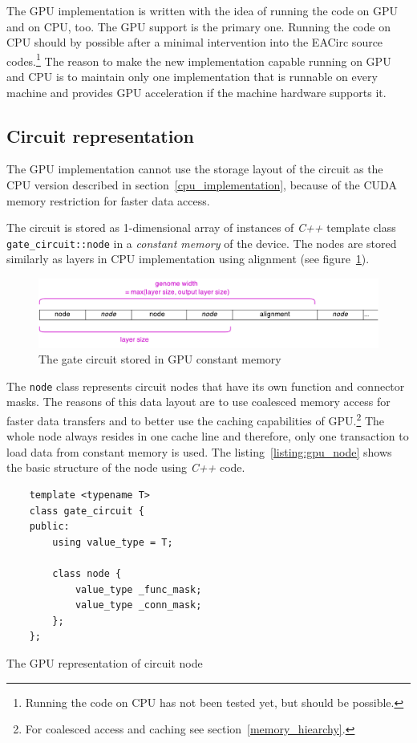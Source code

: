 \documentclass[12pt,oneside]{fithesis2}
\begin{document}
The GPU implementation is written with the idea of running the code on GPU and on CPU, too. The GPU support is the primary one. Running the code on CPU should by possible after a minimal intervention into the EACirc source codes.\footnote{Running the code on CPU has not been tested yet, but should be possible.} The reason to make the new implementation capable running on GPU and CPU is to maintain only one implementation that is runnable on every machine and provides GPU acceleration if the machine hardware supports it.

\subsection{Circuit representation}
\label{gpu_curcuit_repr}

The GPU implementation cannot use the storage layout of the circuit as the CPU version described in section~\ref{cpu_implementation}, because of the CUDA memory restriction for faster data access.

The circuit is stored as 1-dimensional array of instances of \emph{C++} template class \texttt{gate\_circuit::node} in a \emph{constant memory} of the device. The nodes are stored similarly as layers in CPU implementation using alignment (see figure~\ref{fig:gpu_genome}).

\begin{figure}[h]
	\centering
	\includegraphics[width=\textwidth]{figures/gpu_genome.pdf}
	\caption{The gate circuit stored in GPU constant memory}
	\label{fig:gpu_genome}
\end{figure}


The \texttt{node} class represents circuit nodes that have its own function and connector masks. The reasons of this data layout are to use coalesced memory access for faster data transfers and to better use the caching capabilities of GPU.\footnote{For coalesced access and caching see section~\ref{memory_hiearchy}.} The whole node always resides in one cache line and therefore, only one transaction to load data from constant memory is used. The listing~\ref{listing:gpu_node} shows the basic structure of the node using \emph{C++} code.

\begin{listing}[h]
	\begin{verbatim}
	template <typename T>
	class gate_circuit {
	public:
		using value_type = T;
		
		class node {
			value_type _func_mask;
			value_type _conn_mask;
		};	
	};
	\end{verbatim}
	\caption{The GPU representation of circuit node}
	\label{listing:gpu_node}
\end{listing}
\end{document}
